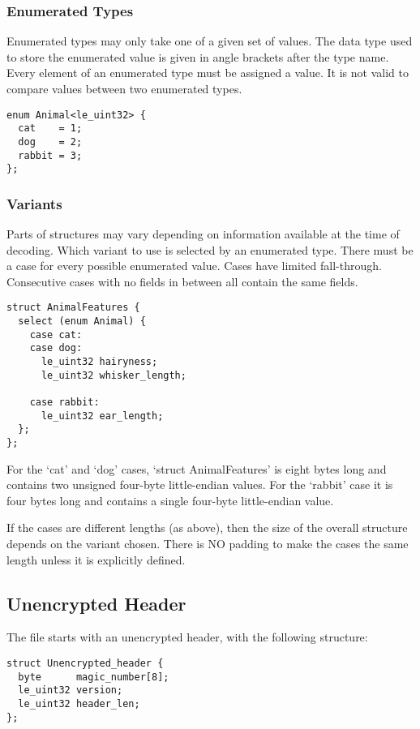 \documentclass[10pt]{article}
\begin{document}
{\subsubsection{Enumerated Types}
Enumerated types may only take one of a given set of values.
The data type used to store the enumerated value is given in angle brackets after the type name.
Every element of an enumerated type must be assigned a value.
It is not valid to compare values between two enumerated types.

\begin{verbatim}
enum Animal<le_uint32> {
  cat    = 1;
  dog    = 2;
  rabbit = 3;
};
\end{verbatim}

\subsubsection{Variants}
Parts of structures may vary depending on information available at the time of decoding.
Which variant to use is selected by an enumerated type.
There must be a case for every possible enumerated value.
Cases have limited fall-through.
Consecutive cases with no fields in between all contain the same fields.

\begin{verbatim}
struct AnimalFeatures {
  select (enum Animal) {
    case cat:
    case dog:
      le_uint32 hairyness;
      le_uint32 whisker_length;

    case rabbit:
      le_uint32 ear_length;
  };
};
\end{verbatim}

For the `cat' and `dog' cases, `struct AnimalFeatures' is eight bytes long and contains two unsigned four-byte
little-endian values.
For the `rabbit' case it is four bytes long and contains a single four-byte little-endian value.

If the cases are different lengths (as above), then the size of the overall structure depends on the variant chosen.
There is NO padding to make the cases the same length unless it is explicitly defined.

\subsection{Unencrypted Header}

The file starts with an unencrypted header, with the following structure:

\begin{verbatim}
struct Unencrypted_header {
  byte      magic_number[8];
  le_uint32 version;
  le_uint32 header_len;
};
\end{verbatim}

}
\end{document}
